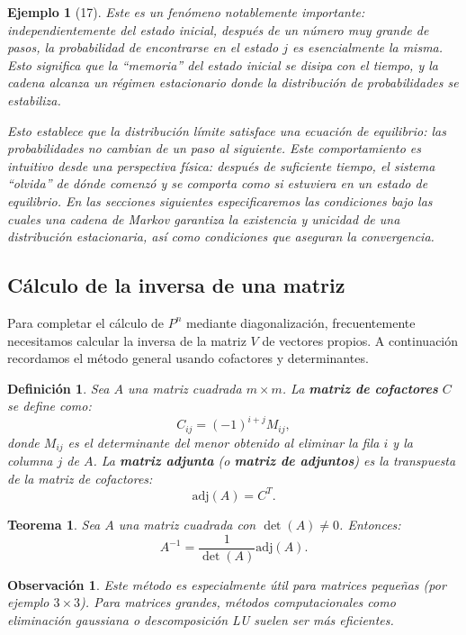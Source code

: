\documentclass[12pt]{book}
\newtheorem{theorem}{Teorema}[chapter]
\newtheorem{definition}{Definición}[chapter]
\newtheorem{example}{Ejemplo}[chapter]
\newtheorem{remark}{Observación}[chapter]
\begin{document}
\begin{example}[17]
Este es un fenómeno notablemente importante: \textit{independientemente del estado inicial}, después de un número muy grande de pasos, la probabilidad de encontrarse en el estado $j$ es esencialmente la misma. Esto significa que la ``memoria'' del estado inicial se disipa con el tiempo, y la cadena alcanza un régimen estacionario donde la distribución de probabilidades se estabiliza.

Esto establece que la distribución límite satisface una ecuación de equilibrio: las probabilidades no cambian de un paso al siguiente. Este comportamiento es intuitivo desde una perspectiva física: después de suficiente tiempo, el sistema ``olvida'' de dónde comenzó y se comporta como si estuviera en un estado de equilibrio.
En las secciones siguientes especificaremos las condiciones bajo las cuales una cadena de Markov garantiza la existencia y unicidad de una distribución estacionaria, así como condiciones que aseguran la convergencia.
\end{example}



\subsection*{Cálculo de la inversa de una matriz}

Para completar el cálculo de $P^n$ mediante diagonalización, frecuentemente necesitamos calcular la inversa de la matriz $V$ de vectores propios. A continuación recordamos el método general usando cofactores y determinantes.

\begin{definition}
Sea $A$ una matriz cuadrada $m \times m$. La \textbf{matriz de cofactores} $C$ se define como:
\[
C_{ij} = (-1)^{i+j} M_{ij},
\]
donde $M_{ij}$ es el determinante del menor obtenido al eliminar la fila $i$ y la columna $j$ de $A$. La \textbf{matriz adjunta} (o \textbf{matriz de adjuntos}) es la transpuesta de la matriz de cofactores:
\[
\text{adj}(A) = C^T.
\]
\end{definition}

\begin{theorem}
Sea $A$ una matriz cuadrada con $\det(A) \neq 0$. Entonces:
\[
A^{-1} = \frac{1}{\det(A)} \text{adj}(A).
\]
\end{theorem}

\begin{remark}
Este método es especialmente útil para matrices pequeñas (por ejemplo $3 \times 3$). Para matrices grandes, métodos computacionales como eliminación gaussiana o descomposición LU suelen ser más eficientes.
\end{remark}
\end{document}
